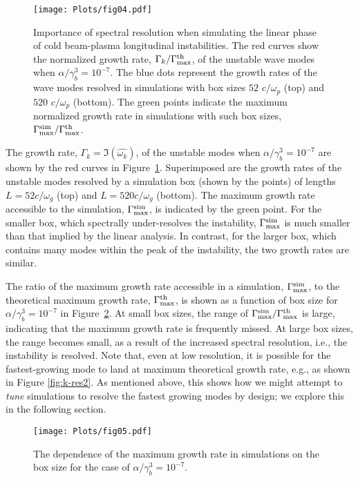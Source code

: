 \documentclass[pop,numberedappendix,iop]{aeb_emulateapj_2015}
\begin{document}
\begin{figure} 
\center
\texttt{[image: Plots/fig04.pdf]}
\caption{
Importance of spectral resolution when simulating the linear phase of cold beam-plasma longitudinal instabilities. The red curves show the normalized growth rate, $\Gamma_k/\Gamma^{\rm th}_{\rm  max}$, of the unstable wave modes when $\alpha/\gamma_b^3=10^{-7}$.
The blue dots represent the growth rates of the wave modes resolved in simulations with box sizes $52$ $c/\omega_p$ (top) and $520$ $c/\omega_p$ (bottom).
The green points indicate the maximum normalized growth rate in simulations with such box sizes, $\Gamma^{\rm sim}_{\rm max}/\Gamma^{\rm th}_{\rm  max}$.
\label{fig:k-res1}}
\end{figure}




The growth rate, $\Gamma_k = \Im{(\hat{\omega_k})}$, of the unstable modes when $\alpha/\gamma^3_b=10^{-7}$ are shown by the red curves in Figure~\ref{fig:k-res1}.
Superimposed are the growth rates of the unstable modes resolved by a simulation box (shown by the points) of lengths $L=52 c/\omega_g$ (top) and $L=520 c/\omega_g$ (bottom).
The maximum growth rate accessible to the simulation, $\Gamma_{\rm max}^{\rm sim}$, is indicated by the green point.
For the smaller box, which spectrally under-resolves the instability, $\Gamma_{\rm max}^{\rm sim}$ is much smaller than that implied by the linear analysis.
In contrast, for the larger box, which contains many modes within the peak of the instability, the two growth rates are similar.




The ratio of the maximum growth rate accessible in a simulation,  $\Gamma^{\rm sim}_{\rm max}$, to the theoretical maximum growth rate, $\Gamma^{\rm th}_{\rm max}$, is shown as a function of box size for $\alpha/\gamma_b^3=10^{-7}$ in Figure~\ref{fig:gsim}.
At small box sizes, the range of $\Gamma^{\rm sim}_{\rm max}/\Gamma^{\rm th}_{\rm max}$ is large, indicating that the maximum growth rate is frequently missed.
At large box sizes, the range becomes small, as a result of the increased spectral resolution, i.e., the instability is resolved.
Note that, even at low resolution, it is possible for the fastest-growing mode to land at maximum theoretical growth rate, e.g., as shown in Figure \ref{fig:k-res2}.
As mentioned above, this shows how we might attempt to {\it tune} simulations to resolve the fastest growing modes by design; we explore this in the following section.

\begin{figure}
\center
\texttt{[image: Plots/fig05.pdf]}
\caption{
The dependence of the maximum growth rate in simulations on the box size for the case of $\alpha/\gamma_b^3 = 10^{-7}$.
\label{fig:gsim}}
\end{figure}
 
\end{document}
